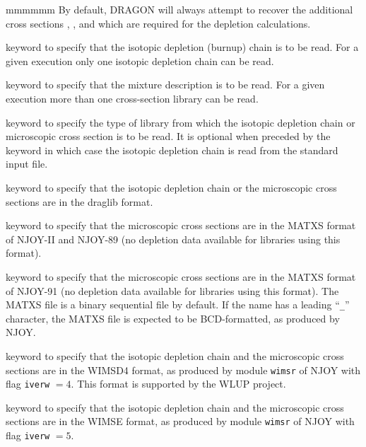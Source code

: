 \begin{ListeDeDescription}{mmmmmm}
By default, DRAGON will always attempt to recover the additional cross sections
, ,  and  which are required for the depletion
calculations. 

\item[\moc{DEPL}] keyword to specify that the isotopic depletion (burnup)
chain is to be read. For a given  execution only one isotopic
depletion chain can be read. 

\item[\moc{MIXS}] keyword to specify that the mixture description is to be
read. For a given  execution more than one cross-section library can
be read. 

\item[\moc{LIB:}] keyword to specify the type of library from which the
isotopic depletion chain or microscopic cross section is to be read. It is
optional when preceded by the keyword  in which case the isotopic
depletion chain is read from the standard input file. 

\item[\moc{DRAGON}] keyword to specify that the isotopic depletion chain or
the microscopic cross sections are in the {\sc draglib} format.

\item[\moc{MATXS}] keyword to specify that the microscopic cross sections are
in the MATXS format of NJOY-II and NJOY-89 (no depletion data available for
libraries using this format).

\item[\moc{MATXS2}] keyword to specify that the microscopic cross sections are
in the MATXS format of NJOY-91 (no depletion data available for libraries using
this format). The MATXS file is a binary sequential file by default. If the name
 has a leading ``{\tt \_}'' character, the MATXS file is expected to be
BCD-formatted, as produced by NJOY.

\item[\moc{WIMSD4}] keyword to specify that the isotopic depletion chain and the
microscopic cross sections are in the WIMSD4 format, as produced by module {\tt wimsr} of NJOY with flag
{\tt iverw} $=4$. This format is supported by the WLUP project.\cite{wlup}

\item[\moc{WIMSE}] keyword to specify that the isotopic depletion chain and the
microscopic cross sections are in the WIMSE format, as produced by module {\tt wimsr} of NJOY with flag
{\tt iverw} $=5$.


\end{ListeDeDescription}
